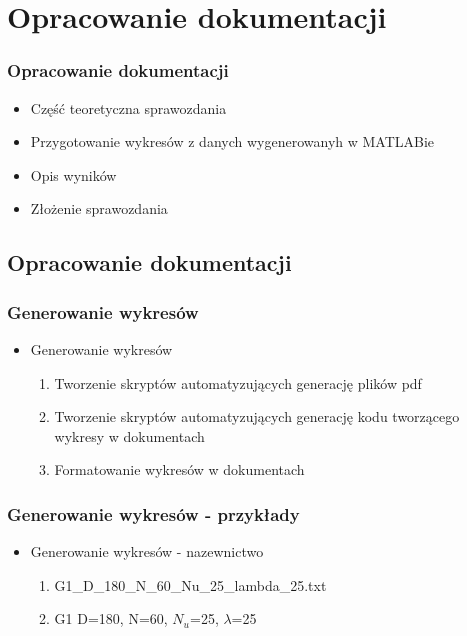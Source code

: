 \section{Opracowanie dokumentacji}

\begin{frame}
    \frametitle{Opracowanie dokumentacji}
    \begin{itemize}[<+->]
        \item Część teoretyczna sprawozdania
        \item Przygotowanie wykresów z danych wygenerowanyh w MATLABie
        \item Opis wyników
        \item Złożenie sprawozdania
    \end{itemize} 
\end{frame}

\subsection{Opracowanie dokumentacji}
\begin{frame}
    \frametitle{Generowanie wykresów }
    \begin{itemize}[<+->]
        \item Generowanie wykresów
            \begin{enumerate}
                \item     Tworzenie skryptów automatyzujących generację plików pdf 
                \item     Tworzenie skryptów automatyzujących generację kodu tworzącego wykresy w dokumentach 
                \item     Formatowanie wykresów w dokumentach 
            \end{enumerate}
    \end{itemize} 
\end{frame}

\begin{frame}
    \frametitle{Generowanie wykresów - przykłady }
    \begin{itemize}[<+->]
        \item Generowanie wykresów - nazewnictwo
            \begin{enumerate}
                \item     G1\_D\_180\_N\_60\_Nu\_25\_lambda\_25.txt
                \item     G1 D=180, N=60, $N_u$=25, $\lambda$=25
            \end{enumerate}
    \end{itemize} 
\end{frame}

